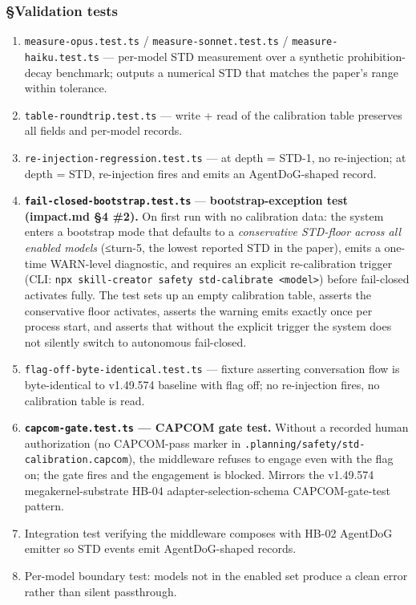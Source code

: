\documentclass[11pt,letterpaper]{article}
\providecommand{\tightlist}{\setlength{\itemsep}{0pt}\setlength{\parskip}{0pt}}
\begin{document}
\subsubsection{§Validation tests}

\begin{enumerate}
\def\labelenumi{\arabic{enumi}.}
\tightlist
\item
  \texttt{measure-opus.test.ts} / \texttt{measure-sonnet.test.ts} /
  \texttt{measure-haiku.test.ts} --- per-model STD measurement over a
  synthetic prohibition-decay benchmark; outputs a numerical STD that
  matches the paper's range within tolerance.
\item
  \texttt{table-roundtrip.test.ts} --- write + read of the calibration
  table preserves all fields and per-model records.
\item
  \texttt{re-injection-regression.test.ts} --- at depth = STD-1, no
  re-injection; at depth = STD, re-injection fires and emits an
  AgentDoG-shaped record.
\item
  \textbf{\texttt{fail-closed-bootstrap.test.ts}} ---
  \textbf{bootstrap-exception test (impact.md §4 \#2).} On first run
  with no calibration data: the system enters a bootstrap mode that
  defaults to a \emph{conservative STD-floor across all enabled models}
  (≤turn-5, the lowest reported STD in the paper), emits a one-time
  WARN-level diagnostic, and requires an explicit re-calibration trigger
  (CLI:
  \texttt{npx\ skill-creator\ safety\ std-calibrate\ \textless{}model\textgreater{}})
  before fail-closed activates fully. The test sets up an empty
  calibration table, asserts the conservative floor activates, asserts
  the warning emits exactly once per process start, and asserts that
  without the explicit trigger the system does not silently switch to
  autonomous fail-closed.
\item
  \texttt{flag-off-byte-identical.test.ts} --- fixture asserting
  conversation flow is byte-identical to v1.49.574 baseline with flag
  off; no re-injection fires, no calibration table is read.
\item
  \textbf{\texttt{capcom-gate.test.ts} --- CAPCOM gate test.} Without a
  recorded human authorization (no CAPCOM-pass marker in
  \texttt{.planning/safety/std-calibration.capcom}), the middleware
  refuses to engage even with the flag on; the gate fires and the
  engagement is blocked. Mirrors the v1.49.574 megakernel-substrate
  HB-04 adapter-selection-schema CAPCOM-gate-test pattern.
\item
  Integration test verifying the middleware composes with HB-02 AgentDoG
  emitter so STD events emit AgentDoG-shaped records.
\item
  Per-model boundary test: models not in the enabled set produce a clean
  error rather than silent passthrough.
\end{enumerate}
\end{document}
